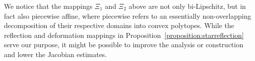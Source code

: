 \documentclass[10pt,a4paper]{article}
\begin{document}
        
\begin{remark}
    We notice that the mappings $\Xi_{1}$ and $\Xi_{2}$ above are not only bi-Lipschitz, but in fact also piecewise affine, 
    where piecewise refers to an essentially non-overlapping decomposition of their respective domains into convex polytopes.
    While the reflection and deformation mappings in Proposition~\ref{proposition:starreflection} serve our purpose,
    it might be possible to improve the analysis or construction and lower the Jacobian estimates. 
\end{remark}
\end{document}
